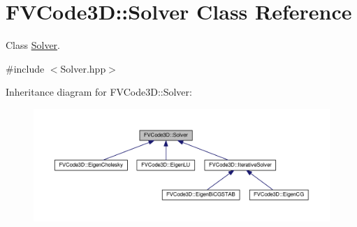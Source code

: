 \hypertarget{classFVCode3D_1_1Solver}{}\section{F\+V\+Code3D\+:\+:Solver Class Reference}
\label{classFVCode3D_1_1Solver}


Class \hyperlink{classFVCode3D_1_1Solver}{Solver}.  




{\ttfamily \#include $<$Solver.\+hpp$>$}



Inheritance diagram for F\+V\+Code3D\+:\+:Solver\+:
\nopagebreak
\begin{figure}[H]
\begin{center}
\leavevmode
\includegraphics[width=350pt]{classFVCode3D_1_1Solver__inherit__graph}
\end{center}
\end{figure}
